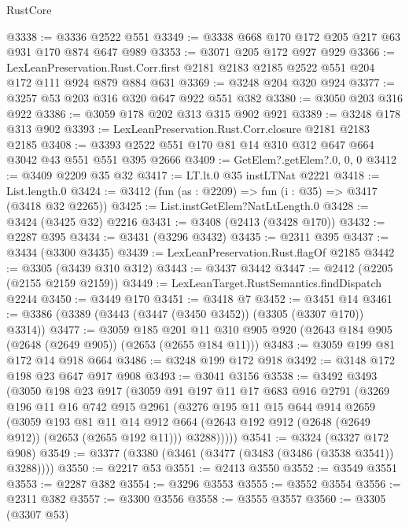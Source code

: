 \begin{lexlean}{RustCore}
\begin{coremodule}
@3338 := @3336 @2522 @551
@3349 := @3338 @668 @170 @172 @205 @217 @63 @931 @170 @874 @647 @989
@3353 := @3071 @205 @172 @927 @929
@3366 := LexLeanPreservation.Rust.Corr.first
    @2181
    @2183
    @2185
    @2522
    @551
    @204
    @172
    @111
    @924
    @879
    @884
    @631
@3369 := @3248 @204 @320 @924
@3377 := @3257 @53 @203 @316 @320 @647 @922 @551 @382
@3380 := @3050 @203 @316 @922
@3386 := @3059 @178 @202 @313 @315 @902 @921
@3389 := @3248 @178 @313 @902
@3393 := LexLeanPreservation.Rust.Corr.closure @2181 @2183 @2185
@3408 := @3393 @2522 @551 @170 @81 @14 @310 @312 @647 @664 @3042 @43 @551 @551 @395 @2666
@3409 := GetElem?.getElem?.{0, 0, 0}
@3412 := @3409 @2209 @35 @32
@3417 := LT.lt.{0} @35 instLTNat @2221
@3418 := List.length.{0}
@3424 := @3412 (fun (as : @2209) => fun (i : @35) => @3417 (@3418 @32 @2265))
@3425 := List.instGetElem?NatLtLength.{0}
@3428 := @3424 (@3425 @32) @2216
@3431 := @3408 (@2413 (@3428 @170))
@3432 := @2287 @395
@3434 := @3431 (@3296 @3432)
@3435 := @2311 @395
@3437 := @3434 (@3300 @3435)
@3439 := LexLeanPreservation.Rust.flagOf @2185
@3442 := @3305 (@3439 @310 @312)
@3443 := @3437 @3442
@3447 := @2412 (@2205 (@2155 @2159 @2159))
@3449 := LexLeanTarget.RustSemantics.findDispatch @2244
@3450 := @3449 @170
@3451 := @3418 @7
@3452 := @3451 @14
@3461 := @3386 (@3389 (@3443 (@3447 (@3450 @3452)) (@3305 (@3307 @170)) @3314))
@3477 := @3059
    @185
    @201
    @11
    @310
    @905
    @920
    (@2643 @184 @905 (@2648 (@2649 @905)) (@2653 (@2655 @184 @11)))
@3483 := @3059 @199 @81 @172 @14 @918 @664
@3486 := @3248 @199 @172 @918
@3492 := @3148 @172 @198 @23 @647 @917 @908
@3493 := @3041 @3156
@3538 := @3492
    @3493
    (@3050
      @198
      @23
      @917
      (@3059
        @91
        @197
        @11
        @17
        @683
        @916
        @2791
        (@3269
          @196
          @11
          @16
          @742
          @915
          @2961
          (@3276
            @195
            @11
            @15
            @644
            @914
            @2659
            (@3059
              @193
              @81
              @11
              @14
              @912
              @664
              (@2643 @192 @912 (@2648 (@2649 @912)) (@2653 (@2655 @192 @11)))
              @3288)))))
@3541 := @3324 (@3327 @172 @908)
@3549 := @3377 (@3380 (@3461 (@3477 (@3483 (@3486 (@3538 @3541)) @3288))))
@3550 := @2217 @53
@3551 := @2413 @3550
@3552 := @3549 @3551
@3553 := @2287 @382
@3554 := @3296 @3553
@3555 := @3552 @3554
@3556 := @2311 @382
@3557 := @3300 @3556
@3558 := @3555 @3557
@3560 := @3305 (@3307 @53)

\end{coremodule}
\end{lexlean}

